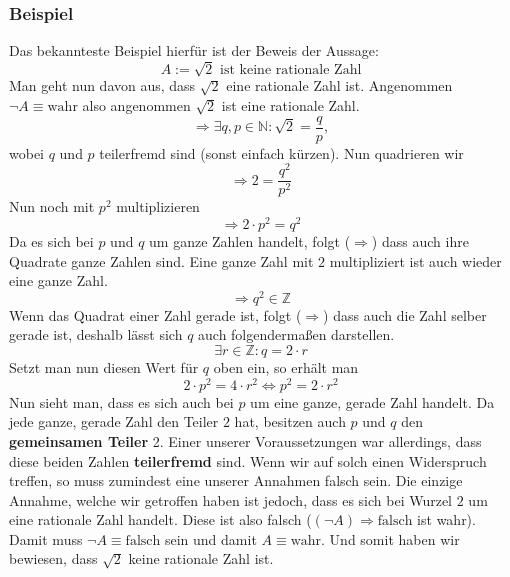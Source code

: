 \subsubsection{Beispiel}
Das bekannteste Beispiel hierfür ist der Beweis der Aussage:
\begin{equation*}
A:=  \sqrt{2} \text{ ist keine rationale Zahl}
\end{equation*}
Man geht nun davon aus, dass $\sqrt{2}$ eine rationale Zahl ist. Angenommen $\neg A \equiv \text{wahr}$ also angenommen $\sqrt{2}$ ist eine rationale Zahl.
\begin{equation*}
\Rightarrow \exists q, p \in \mathbb{N}:\sqrt{2}=\frac{q}{p},
\end{equation*}
wobei $q$ und $p$ teilerfremd sind (sonst einfach kürzen). Nun quadrieren wir
\begin{equation*}
\Rightarrow 2 = \frac{q^2}{p^2}
\end{equation*}
Nun noch mit $p^2$ multiplizieren
\begin{equation*}
\Rightarrow 2 \cdot p^2 = q^2
\end{equation*}
Da es sich bei $p$ und $q$ um ganze Zahlen handelt, folgt ($\Rightarrow$) dass auch ihre Quadrate ganze Zahlen sind. Eine ganze Zahl mit $2$ multipliziert ist auch wieder eine ganze Zahl. 
\begin{equation*}
\Rightarrow q^2 \in \mathbb{Z}
\end{equation*}
Wenn das Quadrat einer Zahl gerade ist, folgt ($\Rightarrow$) dass auch die Zahl selber gerade ist, deshalb lässt sich $q$ auch folgendermaßen darstellen.
\begin{equation*}
\exists r \in \mathbb{Z} : q = 2 \cdot r
\end{equation*}
Setzt man nun diesen Wert für $q$ oben ein, so erhält man
\begin{equation*}
2 \cdot p^2 = 4 \cdot r^2 \iff p^2 = 2 \cdot r^2
\end{equation*}
Nun sieht man, dass es sich auch bei $p$ um eine ganze, gerade Zahl handelt. Da jede ganze, gerade Zahl den Teiler $2$ hat, besitzen auch $p$ und $q$ den \textbf{gemeinsamen Teiler} 2. Einer unserer Voraussetzungen war allerdings, dass diese beiden Zahlen \textbf{teilerfremd} sind. Wenn wir auf solch einen Widerspruch treffen, so muss zumindest eine unserer Annahmen falsch sein. Die einzige Annahme, welche wir getroffen haben ist jedoch, dass es sich bei Wurzel $2$ um eine rationale Zahl handelt. Diese ist also falsch ($(\neg A) \Rightarrow \text{falsch}$ ist wahr). Damit muss $\neg A \equiv \text{falsch}$ sein und damit $A \equiv \text{wahr}$. Und somit haben wir bewiesen, dass $\sqrt{2}$ keine rationale Zahl ist.

